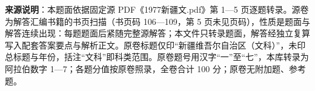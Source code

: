 


\begin{gktip}
\textbf{来源说明}：本题面依据固定源 PDF《1977新疆文.pdf》第 1—5 页逐题转录。源卷为解答汇编书籍的书页扫描（书页码 106—109，第 5 页未见页码），性质是题面与解答连续出现：每题题面后紧随完整源解答；本文件只转录题面，解答经独立复算写入配套答案要点与解析正文。原卷标题仅印“新疆维吾尔自治区（文科）”，未印总标题与年份，括注“文科”即科类范围。原卷题号用汉字“一”至“七”，本库转录为阿拉伯数字 1—7；各题分值按原卷照录，全卷合计 100 分；原卷无附加题、参考题。
\end{gktip}

\par\medskip

